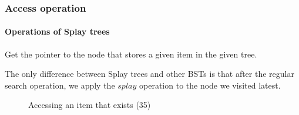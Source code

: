 \documentclass{beamer}
\theoremstyle{plain}
\begin{document}
    \begin{frame}
        \frametitle{Access operation}
        \framesubtitle{Operations of Splay trees}
    
        Get the pointer to the node that stores a given item in the given tree.

        The only difference between Splay trees and other BSTs is that after the regular search operation, we apply the $splay$ operation to the node we visited latest.

        \begin{figure}
            \quad
            \caption{Accessing an item that exists (35)}
        \end{figure}
    
    \end{frame}
\end{document}
